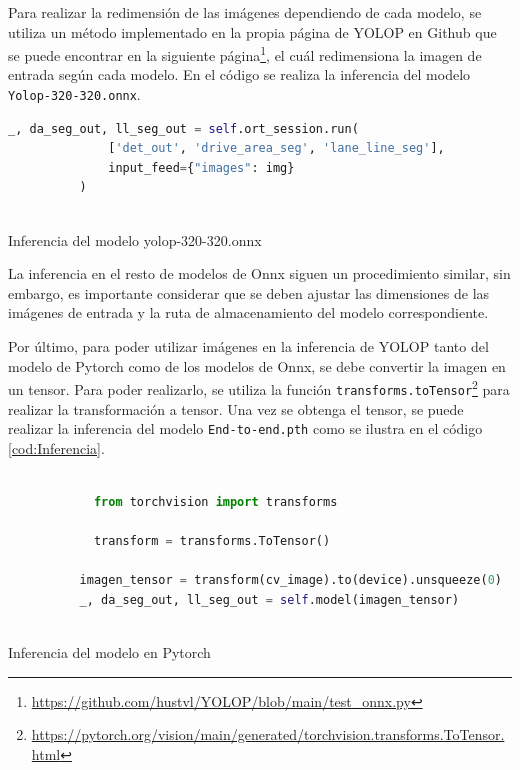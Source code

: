         Para realizar la redimensión de las imágenes dependiendo de cada modelo, se utiliza un método implementado en la propia página de YOLOP en Github 
        que se puede encontrar en la siguiente página\footnote{\url{https://github.com/hustvl/YOLOP/blob/main/test_onnx.py}}, el cuál redimensiona la imagen de entrada según cada modelo. En el código 
        \label{cod:Inferencia_onnx} se realiza la inferencia del modelo \texttt{Yolop-320-320.onnx}. 

        \begin{code}[h]
          \begin{lstlisting}[language=Python]
            _, da_seg_out, ll_seg_out = self.ort_session.run(
              ['det_out', 'drive_area_seg', 'lane_line_seg'],
              input_feed={"images": img}
          )
        
          \end{lstlisting}
          \caption[Inferencia del modelo yolop-320-320.onnx]{Inferencia del modelo yolop-320-320.onnx}
          \label{cod:Inferencia_onnx}
          \end{code}  

        La inferencia en el resto de modelos de Onnx siguen un procedimiento similar, sin embargo, es importante considerar que se deben ajustar las dimensiones de las imágenes de entrada
        y la ruta de almacenamiento del modelo correspondiente.\newline

        Por último, para poder utilizar imágenes en la inferencia de YOLOP tanto del modelo de Pytorch como de los modelos de Onnx, se debe convertir la imagen en un tensor. Para poder realizarlo, se utiliza la función \texttt{transforms.toTensor}\footnote{\url{https://pytorch.org/vision/main/generated/torchvision.transforms.ToTensor.html}} 
        para realizar la transformación a tensor. Una vez se obtenga el tensor, se puede realizar la inferencia del modelo \texttt{End-to-end.pth} como se ilustra en el código \ref{cod:Inferencia}.
    
        \begin{code}[h]
          \begin{lstlisting}[language=Python]
         
            from torchvision import transforms
    
            transform = transforms.ToTensor() 
                        
          imagen_tensor = transform(cv_image).to(device).unsqueeze(0)
          _, da_seg_out, ll_seg_out = self.model(imagen_tensor)
        
          \end{lstlisting}
          \caption[Inferencia del modelo]{Inferencia del modelo en Pytorch}
          \label{cod:Inferencia}
          \end{code}  
    
